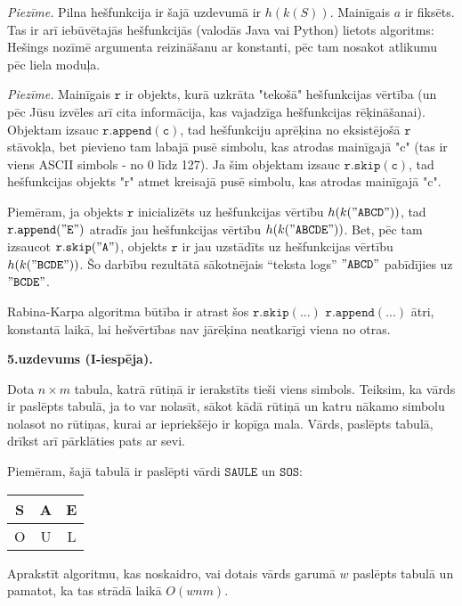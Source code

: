 \documentclass[a4paper,12pt]{article}
\begin{document}
\vspace{5pt}
{\small {\em Piezīme.} 
Pilna hešfunkcija ir šajā uzdevumā ir $h(k(S))$. Mainīgais $a$ ir fiksēts. 
Tas ir arī iebūvētajās hešfunkcijās (valodās Java vai Python) lietots algoritms: 
Hešings nozīmē argumenta rei\-zi\-nā\-ša\-nu ar konstanti, pēc tam nosakot atlikumu pēc liela moduļa.

\vspace{5pt}
{\small {\em Piezīme.} 
Mainīgais $\mathtt{r}$ ir objekts, kurā uzkrāta "tekošā" hešfunkcijas vērtība 
(un pēc Jūsu izvēles arī cita informācija, kas vajadzīga hešfunkcijas rēķināšanai).
Objektam izsauc $\mathtt{r.append(c)}$, tad hešfunkciju aprēķina no eksistējošā $\mathtt{r}$ stāvokļa, 
bet pievieno tam labajā pusē simbolu, kas atrodas mainīgajā "c" (tas ir viens ASCII simbols - no 0 līdz 127). 
Ja šim objektam izsauc $\mathtt{r.skip(c)}$, tad hešfunkcijas objekts "r" atmet 
kreisajā pusē simbolu, kas atrodas mainīgajā "c".

Piemēram, ja objekts $\mathtt{r}$ inicializēts uz hešfunkcijas vērtību 
$h(k(\mathtt{"ABCD"}))$, tad $\mathtt{r.append("E")}$ atradīs jau hešfunkcijas vērtību
$h(k(\mathtt{"ABCDE"}))$. Bet, pēc tam izsaucot $\mathtt{r.skip("A")}$, objekts
$\mathtt{r}$ ir jau uzstādīts uz hešfunkcijas vērtību $h(k(\mathtt{"BCDE"}))$. 
Šo darbību rezultātā sākotnējais ``teksta logs''  $\mathtt{"ABCD"}$ pabīdījies uz
$\mathtt{"BCDE"}$.

Rabina-Karpa algoritma būtība ir \textendash{} atrast šos 
$\mathtt{r.skip(...)}$ $\mathtt{r.append(...)}$ ātri, konstantā laikā, lai hešvērtības nav jārēķina
neatkarīgi viena no otras.
}

\vspace{10pt}
{\bf 5.uzdevums (I-iespēja).}
 
Dota $n \times m$ tabula, katrā rūtiņā ir ierakstīts
tieši viens simbols. Teiksim, ka vārds ir paslēpts tabulā, ja to var nolasīt,
sākot kādā rūtiņā un katru nākamo simbolu nolasot no rūtiņas, kurai ar
iepriekšējo ir kopīga mala. Vārds, paslēpts tabulā, drīkst arī pārklāties
pats ar sevi.

Piemēram, šajā tabulā ir paslēpti vārdi $\mathtt{SAULE}$ un $\mathtt{SOS}$:

\begin{tabular}{|c|c|c|} \hline
S & A & E\\ \hline
O & U & L\\ \hline
\end{tabular}

Aprakstīt algoritmu, kas noskaidro, vai dotais vārds garumā $w$ paslēpts
tabulā un pamatot, ka tas strādā laikā $O(wnm)$.



}
\end{document}
